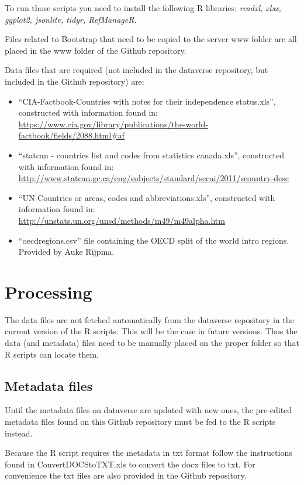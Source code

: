 \documentclass[a4paper]{article}
\begin{document}
To run those scripts you need to install the following R libraries: 
\textit{readxl, xlsx, ggplot2, jsonlite, tidyr, RefManageR.}

Files related to Bootstrap that need to be copied to the server www folder are 
all placed in the www folder of the Github repository.

Data files that are required (not included in the dataverse repository, but 
included in the Github repository) are:
\begin{itemize}
 \item ``CIA-Factbook-Countries with notes for their independence status.xls'', 
constructed with information found in: 
\url{
https://www.cia.gov/library/publications/the-world-factbook/fields/2088.html#af}
 \item ``statcan - countries list and codes from statistics canada.xls'', 
constructed with information found in: 
\url{http://www.statcan.gc.ca/eng/subjects/standard/sccai/2011/scountry-desc}
 \item ``UN Countries or areas, codes and abbreviations.xls'', constructed with 
information found in:
\url{http://unstats.un.org/unsd/methods/m49/m49alpha.htm}
\item ``oecdregions.csv'' file containing the OECD split of the world intro 
regions. Provided by Auke Rijpma.
\end{itemize}

\section{Processing}

The data files are not fetched automatically from the dataverse repository in 
the current version of the R scripts. This will be the case in future versions.
Thus the data (and metadata) files need to be manually placed on the proper 
folder so that R scripts can locate them. 

\subsection{Metadata files}

Until the metadata files on dataverse are updated with new ones, the pre-edited 
metadata files found on this Github repository must be fed to the R scripts 
instead. 

Because the R script requires the metadata in txt format follow the 
instructions found in ConvertDOCStoTXT.xls to convert the docx files to txt.
For convenience the txt files are also provided in the Github repository.
\end{document}
